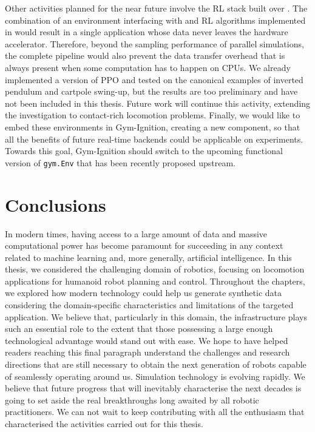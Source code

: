 Other activities planned for the near future involve the \ac{RL} stack built over \jaxsim.
The combination of an environment interfacing with \jaxsim and \ac{RL} algorithms implemented in \jax would result in a single application whose data never leaves the hardware accelerator.
Therefore, beyond the sampling performance of parallel simulations, the complete pipeline would also prevent the data transfer overhead that is always present when some computation has to happen on \acp{CPU}.
We already implemented a \jax version of \ac{PPO} and tested on the canonical examples of inverted pendulum and cartpole swing-up, but the results are too preliminary and have not been included in this thesis.
Future work will continue this activity, extending the investigation to contact-rich locomotion problems.
Finally, we would like to embed these environments in Gym-Ignition, creating a new \jaxsim \scenario component, so that all the benefits of future real-time backends could be applicable on \jaxsim experiments.
Towards this goal, Gym-Ignition should switch to the upcoming functional version of \verb|gym.Env| that has been recently proposed upstream. 

\vfill
\section*{Conclusions}

In modern times, having access to a large amount of data and massive computational power has become paramount for succeeding in any context related to machine learning and, more generally, artificial intelligence.
In this thesis, we considered the challenging domain of robotics, focusing on locomotion applications for humanoid robot planning and control.
Throughout the chapters, we explored how modern technology could help us generate synthetic data considering the domain-specific characteristics and limitations of the targeted application.
We believe that, particularly in this domain, the infrastructure plays such an essential role to the extent that those possessing a large enough technological advantage would stand out with ease.
We hope to have helped readers reaching this final paragraph understand the challenges and research directions that are still necessary to obtain the next generation of robots capable of seamlessly operating around us.
Simulation technology is evolving rapidly.
We believe that future progress that will inevitably characterise the next decades is going to set aside the real breakthroughs long awaited by all robotic practitioners.
We can not wait to keep contributing with all the enthusiasm that characterised the activities carried out for this thesis.
